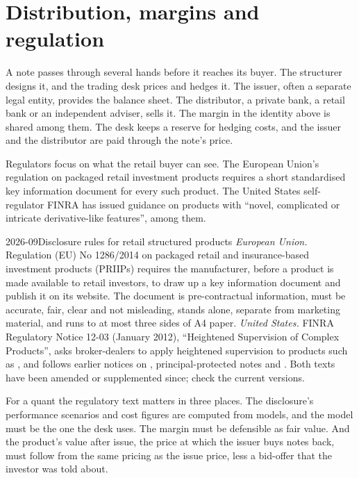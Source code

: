 \section{Distribution, margins and regulation}

A note passes through several hands before it reaches its buyer. The structurer designs it, and the trading desk prices and hedges
it. The issuer, often a separate legal entity, provides the balance sheet. The distributor, a private bank, a retail bank or an
independent adviser, sells it. The margin in the identity above is shared among them. The desk keeps a reserve for hedging costs, and
the issuer and the distributor are paid through the note's price.

Regulators focus on what the retail buyer can see. The European Union's regulation on packaged retail investment products requires a
short standardised key information document for every such product. The United States self-regulator FINRA has issued guidance on
products with ``novel, complicated or intricate derivative-like features'',  among them.

\begin{dated}{2026-09}{Disclosure rules for retail structured products}\label{dat:dv:the-structured-products-business:rules}
\emph{European Union.} Regulation (EU) No 1286/2014 on packaged retail and insurance-based investment products (PRIIPs) requires
the manufacturer, before a product is made available to retail investors, to draw up a key information document and publish it on
its website. The document is pre-contractual information, must be accurate, fair, clear and not misleading, stands alone, separate
from marketing material, and runs to at most three sides of A4 paper. \emph{United States.} FINRA Regulatory Notice 12-03 (January
2012), ``Heightened Supervision of Complex Products'', asks broker-dealers to apply heightened supervision to products such as
, and follows earlier notices on , principal-protected notes and . Both texts
have been amended or supplemented since; check the current versions.
\end{dated}

For a quant the regulatory text matters in three places. The disclosure's performance scenarios and cost figures are computed from
models, and the model must be the one the desk uses. The margin must be defensible as fair value. And the product's value after issue,
the price at which the issuer buys notes back, must follow from the same pricing as the issue price, less a bid-offer that the
investor was told about.

